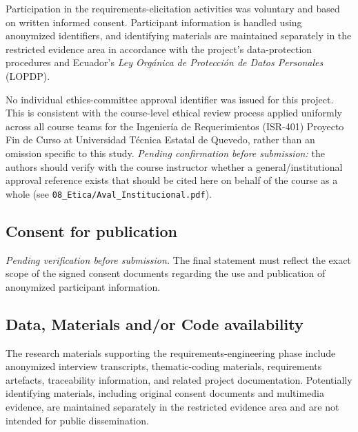 \documentclass[12pt]{article}
\begin{document}
Participation in the requirements-elicitation activities was voluntary
and based on written informed consent. Participant information is
handled using anonymized identifiers, and identifying materials are
maintained separately in the restricted evidence area in accordance
with the project's data-protection procedures and Ecuador's
\textit{Ley Orgánica de Protección de Datos Personales}
(LOPDP).

\par
No individual ethics-committee approval identifier was issued for
this project. This is consistent with the course-level ethical
review process applied uniformly across all course teams for the
Ingeniería de Requerimientos (ISR-401) Proyecto Fin de Curso at
Universidad Técnica Estatal de Quevedo, rather than an omission
specific to this study. \textit{Pending confirmation before
submission:} the authors should verify with the course instructor
whether a general/institutional approval reference exists that
should be cited here on behalf of the course as a whole (see
\texttt{08\_Etica/Aval\_Institucional.pdf}).


\subsection*{Consent for publication}

\textit{Pending verification before submission.}
The final statement must reflect the exact scope of the signed consent
documents regarding the use and publication of anonymized participant
information.


\subsection*{Data, Materials and/or Code availability}

The research materials supporting the requirements-engineering phase
include anonymized interview transcripts, thematic-coding materials,
requirements artefacts, traceability information, and related project
documentation. Potentially identifying materials, including original
consent documents and multimedia evidence, are maintained separately
in the restricted evidence area and are not intended for public
dissemination.
\end{document}
